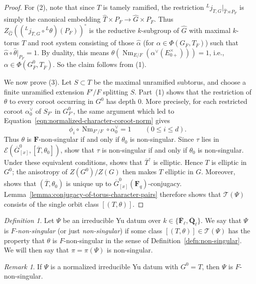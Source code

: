 \documentclass[reqno]{amsart}
\numberwithin{equation}{subsection}
\newcommand{\F}{\mathbf{F}}
\newcommand{\Q}{\mathbf{Q}}
\newcommand{\ol}[1]{\overline{#1}}
\newcommand{\wh}[1]{\widehat{#1}}
\newcommand{\ld}{{}^L}
\newcommand\cE{\mathcal{E}}
\newcommand\cT{\mathcal{T}}
\DeclareMathOperator{\Nm}{Nm}
\theoremstyle{remark}
\newtheorem{remark}[thm]{Remark}
\newtheorem{defn}[thm]{Definition}
\numberwithin{equation}{subsection}
\numberwithin{figure}{subsection}
\begin{document}
\begin{proof}
For (2), note that since $T$ is tamely ramified, the restriction $\ld j_{T,G}|_{\wh T \rtimes P_F}$ is simply the canonical embedding $\wh T \times P_F \to \wh G \times P_F$. Thus $Z_{\wh G}((\ld j_{T,G} \circ \ld\theta)(P_F))^\circ$ is the reductive $k$-subgroup of $\wh G$ with maximal $k$-torus $\wh T$ and root system consisting of those $\wh\alpha$ (for $\alpha \in \Phi(G_{\ol F}, T_{\ol F})$) such that $\wh\alpha \circ \wh\theta|_{P_F} = 1$. By duality, this means $\theta(\Nm_{E/F}(\alpha^\vee(E_{0+}^\times))) = 1$, i.e., $\alpha \in \Phi(G^0_{\ol F}, T_{\ol F})$. So the claim follows from (1).

We now prove (3). Let $S\subset T$ be the maximal unramified subtorus, and choose a finite unramified extension $F'/F$ splitting $S$. Part~(1) shows that the restriction of $\theta$ to every coroot occurring in $G^0$ has depth $0$. More precisely, for each restricted coroot $\alpha_0^\vee$ of $S_{F'}$ in $G^0_{F'}$, the same argument which led to Equation~\eqref{eqn:normalized-character-coroot-norm} gives
\[
\phi_i\circ \Nm_{F'/F}\circ\alpha_0^\vee=1
\qquad(0\leq i\leq d).
\]
Thus $\theta$ is $\F$-non-singular if and only if $\theta_0$ is non-singular. Since $\tau$ lies in $\cE(\ol G^0_{[x]}, [\ol T,\theta_0])$, \cite[Definition~2.9.3 and Lemma~2.9.2]{Cot26b} show that $\tau$ is non-singular if and only if $\theta_0$ is non-singular. Under these equivalent conditions, \cite[Lemma~2.9.4]{Cot26b} shows that $\ol T^\circ$ is elliptic. Hence $T$ is elliptic in $G^0$; the anisotropy of $Z(G^0)/Z(G)$ then makes $T$ elliptic in $G$. Moreover, \cite[Lemma~2.9.2]{Cot26b} shows that $(\ol T, \theta_0)$ is unique up to $\ol G_{[x]}^0(\F_q)$-conjugacy. Lemma~\ref{lemma:conjugacy-of-torus-character-pairs} therefore shows that $\cT(\Psi)$ consists of the single orbit class $[(T,\theta)]$.
\end{proof}

\begin{defn}\label{defn:non-singular-yu-datum}
Let $\Psi$ be an irreducible Yu datum over $k\in\{\ol\F_\ell,\ol\Q_\ell\}$. We say that $\Psi$ is \textit{$F$-non-singular} (or just \textit{non-singular}) if some class $[(T,\theta)]\in\cT(\Psi)$ has the property that $\theta$ is $F$-non-singular in the sense of Definition~\ref{defn:non-singular}. We will then say that $\pi = \pi(\Psi)$ is non-singular.
\end{defn}

\begin{remark}\label{remark:toral-yu-ns}
If $\Psi$ is a normalized irreducible Yu datum with $G^0 = T$, then $\Psi$ is $F$-non-singular.
\end{remark}
\end{document}
